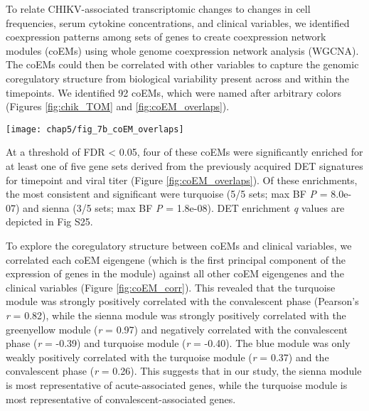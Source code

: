 To relate CHIKV-associated transcriptomic changes to changes in cell \subcommunity{} frequencies, serum cytokine concentrations, and clinical variables, we identified coexpression patterns among sets of genes to create coexpression network modules (coEMs) using whole genome coexpression network analysis (WGCNA).\autocite{Zhang2005} The coEMs could then be correlated with other variables to capture the genomic coregulatory structure from biological variability present across and within the timepoints. We identified 92 coEMs, which were named after arbitrary colors (Figures \ref{fig:chik_TOM} and \ref{fig:coEM_overlaps}). 
\begin{figure*}
  \centering
  \texttt{[image: chap5/fig\_7b\_coEM\_overlaps]}
  \caption[Enrichment of five subsets of the DET signatures in the coexpression modules]{
  \textbf{Enrichment of five subsets of the DET signatures for CHIKV infection phase and viral titer} (see Figures \ref{fig:DET_timepoint_volcano} and \ref{fig:DET_viral_volcano}) among each of the 92 coEMs (X axis), showing the fractional overlap of the module with the DET signature (Y axis). *\emph{q} < 0.05, ***\emph{q} < 0.001; \emph{q} values are Benjamini-Hochberg adjusted \emph{P} values (Fig S25 shows \emph{q} values for all tests). The four coEMs highlighted in Figure \ref{fig:chik_TOM} have at least one significant DET signature enrichment.
  }
  \label{fig:coEM_overlaps}
\end{figure*}
At a threshold of FDR < 0.05, four of these coEMs were significantly enriched for at least one of five gene sets derived from the previously acquired DET signatures for timepoint and viral titer (Figure \ref{fig:coEM_overlaps}). Of these enrichments, the most consistent and significant were turquoise (5/5 sets; max BF \emph{P} = 8.0e-07) and sienna (3/5 sets; max BF \emph{P} = 1.8e-08). DET enrichment \emph{q} values are depicted in Fig S25.

To explore the coregulatory structure between coEMs and clinical variables, we correlated each coEM eigengene (which is the first principal component of the expression of genes in the module) against all other coEM eigengenes and the clinical variables (Figure \ref{fig:coEM_corr}). This revealed that the turquoise module was strongly positively correlated with the convalescent phase (Pearson’s \emph{r} = 0.82), while the sienna module was strongly positively correlated with the greenyellow module (\emph{r} = 0.97) and negatively correlated with the convalescent phase (\emph{r} = -0.39) and turquoise module (\emph{r} = -0.40). The blue module was only weakly positively correlated with the turquoise module (\emph{r} = 0.37) and the convalescent phase (\emph{r} = 0.26). This suggests that in our study, the sienna module is most representative of acute-associated genes, while the turquoise module is most representative of convalescent-associated genes.

